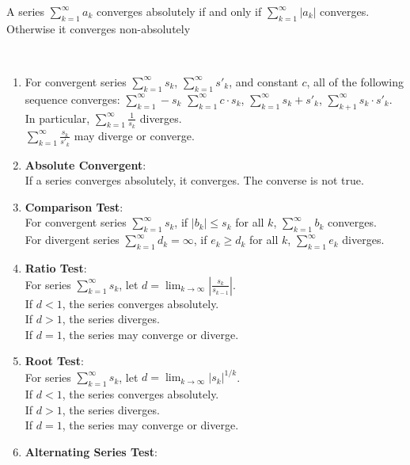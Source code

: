 \documentclass[../note.tex]{subfiles}
\begin{document}
\begin{definition} A series $\sum^{\infty}_{k=1}a_k$ converges absolutely if and only if $\sum^{\infty}_{k=1}|a_k|$ converges. Otherwise it converges non-absolutely
\end{definition}
\begin{theorem}\label{th:ConvergenceReveries}
\ 
\begin{enumerate}
	\item For convergent series $\sum^{\infty}_{k=1} s_k$, $\sum^{\infty}_{k=1}s'_k$, and constant $c$, all of the following sequence converges:
		$\sum^{\infty}_{k=1}-s_k$ $\sum^{\infty}_{k=1}c\cdot s_k$, $\sum^{\infty}_{k=1}s_k+s'_k$, $\sum^{\infty}_{k+1}s_k\cdot s'_k$.\\
		In particular, $\sum^{\infty}_{k=1}\frac{1}{s_k}$ diverges.\\
		$\sum^{\infty}_{k=1}\frac{s_k}{s'_k}$ may diverge or converge.
	\item \label{th:ConvergenceReveries:en:absoluteconverge} \textbf{Absolute Convergent}:\\
		If a series converges absolutely, it converges. The converse is not true. 
	\item \textbf{Comparison Test}:\\
		For convergent series $\sum^{\infty}_{k=1}s_k$, if $|b_k|\leq s_k$ for all $k$, $\sum^{\infty}_{k=1}b_k$ converges.\\
		For divergent series $\sum^{\infty}_{k=1}d_k = \infty$, if $e_k\geq d_k$ for all $k$, $\sum^{\infty}_{k=1}e_k$ diverges. 
	\item \textbf{Ratio Test}:\\
		For series $\sum^{\infty}_{k=1}s_k$, let $d=\lim_{k \to \infty} |\frac{s_k}{s_{k-1}}|$.\\
		If $d<1$, the series converges absolutely.\\
		If $d>1$, the series diverges.\\
		If $d=1$, the series may converge or diverge.
	\item \textbf{Root Test}:\\
		For series $\sum^{\infty}_{k=1}s_k$, let $d=\lim_{k \to \infty} |s_k|^{1/k}$.\\
		If $d<1$, the series converges absolutely.\\
		If $d>1$, the series diverges.\\
		If $d=1$, the series may converge or diverge.
	\item \textbf{Alternating Series Test}: \label{AlternatingSeriesTest}\\

\end{enumerate}
\end{theorem}
\end{document}
